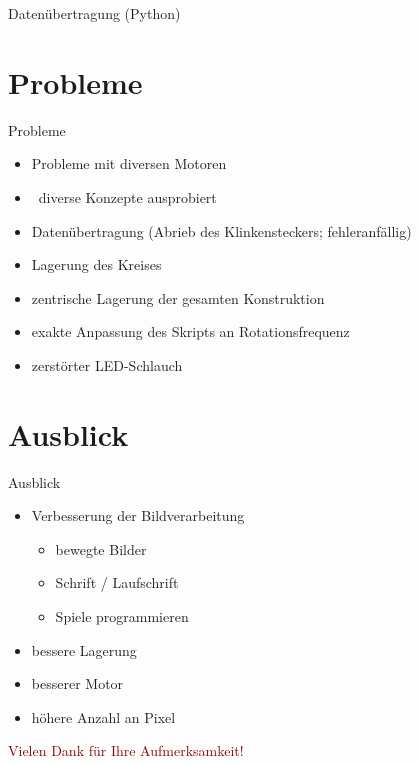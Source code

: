 \begin{frame}{Datenübertragung (Python)}

\end{frame}

\section{Probleme}

\begin{frame}{Probleme}
\begin{itemize}
\item Probleme mit diversen Motoren
\item[] \rightarrow\ diverse Konzepte ausprobiert
\item Datenübertragung (Abrieb des Klinkensteckers; fehleranfällig)
\item Lagerung des Kreises
\item zentrische Lagerung der gesamten Konstruktion
\item exakte Anpassung des Skripts an Rotationsfrequenz
\item zerstörter LED-Schlauch
\end{itemize}
\end{frame}

\section{Ausblick}

\begin{frame}{Ausblick}
\begin{itemize}
\item Verbesserung der Bildverarbeitung
\begin{itemize}
\item bewegte Bilder
\item Schrift / Laufschrift
\item Spiele programmieren
\end{itemize}
\item bessere Lagerung
\item besserer Motor
\item höhere Anzahl an Pixel
\end{itemize}
\end{frame}

\begin{frame}
\begin{center}
\textcolor{darkred}{\huge Vielen Dank für Ihre Aufmerksamkeit!}
\end{center}
\end{frame}
